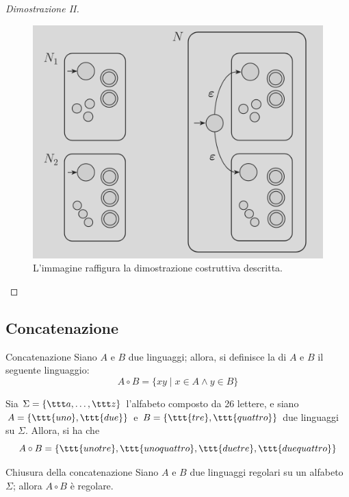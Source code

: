 \documentclass[a4paper, 12pt]{report}
\begin{document}
\begin{proof}[Dimostrazione II]
        \begin{figure}[H]
            \centering
            \includegraphics[scale=0.35]{../assets/union-neg.png}
            \caption{L'immagine raffigura la dimostrazione costruttiva descritta.}
        \end{figure}

    \end{proof}

    \subsection{Concatenazione}

    \begin{frameddefn}{Concatenazione}
        Siano $A$ e $B$ due linguaggi; allora, si definisce la  di $A$ e $B$ il seguente linguaggio: $$A \circ B = \{xy \mid x \in A \land y \in B\}$$
    \end{frameddefn}

    \begin{example}[Concatenazione]
        Sia $\Sigma = \{\ttt a , \ldots, \ttt z\}$ l'alfabeto composto da 26 lettere, e siano $A = \{\ttt{uno}, \ttt{due}\}$ e $B = \{\ttt{tre}, \ttt{quattro}\}$ due linguaggi su $\Sigma$. Allora, si ha che $$A \circ B = \{\ttt{unotre}, \ttt{unoquattro}, \ttt{duetre}, \ttt{duequattro}\}$$
    \end{example}

    \begin{framedprop}[label={closure concat}]{Chiusura della concatenazione}
        Siano $A$ e $B$ due linguaggi regolari su un alfabeto $\Sigma$; allora $A \circ B$ è regolare.
    \end{framedprop}
\end{document}
